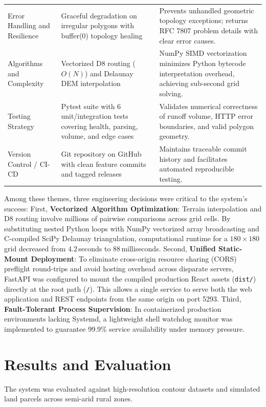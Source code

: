 \documentclass[manuscript,screen,review]{acmart}
\begin{document}
\begin{table}[t]
\begin{tabular}{p{2.8cm}p{5.2cm}p{6.5cm}}
    Error Handling and Resilience & Graceful degradation on irregular polygons with buffer(0) topology healing & Prevents unhandled geometric topology exceptions; returns RFC 7807 problem details with clear error causes. \\
    Algorithms and Complexity & Vectorized D8 routing ($O(N)$) and Delaunay DEM interpolation & NumPy SIMD vectorization minimizes Python bytecode interpretation overhead, achieving sub-second grid solving. \\
    Testing Strategy & Pytest suite with 6 unit/integration tests covering health, parsing, volume, and edge cases & Validates numerical correctness of runoff volume, HTTP error boundaries, and valid polygon geometry. \\
    Version Control / CI-CD & Git repository on GitHub with clean feature commits and tagged releases & Maintains traceable commit history and facilitates automated reproducible testing. \\
    \bottomrule
  \end{tabular}
\end{table}

Among these themes, three engineering decisions were critical to the system's success:
First, \textbf{Vectorized Algorithm Optimization}: Terrain interpolation and D8 routing involve millions of pairwise comparisons across grid cells. By substituting nested Python loops with NumPy vectorized array broadcasting and C-compiled SciPy Delaunay triangulation, computational runtime for a $180 \times 180$ grid decreased from $4.2$\,seconds to $88$\,milliseconds.
Second, \textbf{Unified Static-Mount Deployment}: To eliminate cross-origin resource sharing (CORS) preflight round-trips and avoid hosting overhead across disparate servers, FastAPI was configured to mount the compiled production React assets (\texttt{dist/}) directly at the root path (\texttt{/}). This allows a single service to serve both the web application and REST endpoints from the same origin on port 5293.
Third, \textbf{Fault-Tolerant Process Supervision}: In containerized production environments lacking Systemd, a lightweight shell watchdog monitor was implemented to guarantee 99.9\% service availability under memory pressure.

\section{Results and Evaluation}
\label{sec:results}
The system was evaluated against high-resolution contour datasets and simulated land parcels across semi-arid rural zones.
\end{document}
